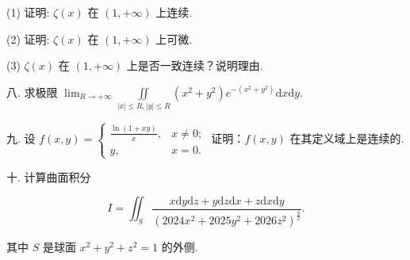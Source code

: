 \documentclass{examcollection}
\renewcommand{\displayformula}[1]{\[#1\]}
\begin{document}
{\begin{minipage}{\textwidth}
(1) 证明: $\zeta(x)$ 在 $(1, +\infty)$ 上连续.\par
(2) 证明: $\zeta(x)$ 在 $(1, +\infty)$ 上可微.\par
(3) $\zeta(x)$ 在 $(1, +\infty)$ 上是否一致连续？说明理由.\par
八. 求极限 $\lim_{R\to +\infty}\iint \limits_{|x|\leq R,|y|\leq R}(x^2 +y^2)e^{-(x^2 +y^2)}\mathrm{d}x\mathrm{d}y.$\par
九. 设 $f(x, y) = \begin{cases} \frac{\ln(1 + xy)}{x}, & x \neq 0; \\ y, & x = 0. \end{cases}$ 证明：$f(x, y)$ 在其定义域上是连续的.\par
十. 计算曲面积分\par
\displayformula{I = \iint_ {S} \frac {x \mathrm{d} y \mathrm{d} z + y \mathrm{d} z \mathrm{d} x + z \mathrm{d} x \mathrm{d} y}{(2024 x ^ {2} + 2025 y ^ {2} + 2026 z ^ {2}) ^ {\frac {3}{2}}}.}\par
其中 $S$ 是球面 $x^{2} + y^{2} + z^{2} = 1$ 的外侧.\par
\end{minipage}}
\ifdim\dimexpr\ht\proofbox+\dp\proofbox\relax>\textheight
\noindent\resizebox{!}{\textheight}{\usebox{\proofbox}}\else\noindent\usebox{\proofbox}\fi\clearpage
\end{document}
